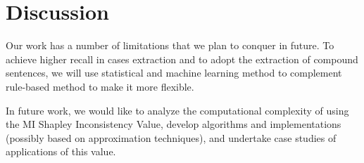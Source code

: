 \section{Discussion}
\begin{minipage}{\linewidth}
	\begin{multicols*}{2}
		Our work has a number of limitations that we plan to conquer in future. To achieve higher recall in cases extraction and to adopt the extraction of compound sentences, we will use statistical and machine learning method to complement rule-based method to make it more flexible. 
		
		In future work, we would like to analyze the computational complexity of using the MI Shapley Inconsistency Value, develop algorithms and implementations (possibly based on approximation techniques), and undertake case studies of applications of this value.
	\end{multicols*}
\end{minipage}
